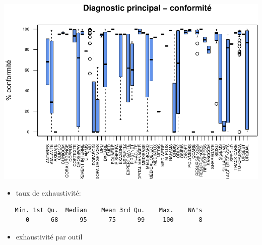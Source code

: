 \documentclass[]{article}
\begin{document}
\includegraphics{septembre2015_files/figure-latex/unnamed-chunk-22-1.pdf}

\begin{itemize}
\itemsep1pt\parskip0pt
\item
  taux de exhaustivité:
\end{itemize}

\begin{verbatim}
   Min. 1st Qu.  Median    Mean 3rd Qu.    Max.    NA's 
      0      68      95      75      99     100       8 
\end{verbatim}

\begin{itemize}
\itemsep1pt\parskip0pt
\item
  exhaustivité par outil
\end{itemize}
\end{document}
